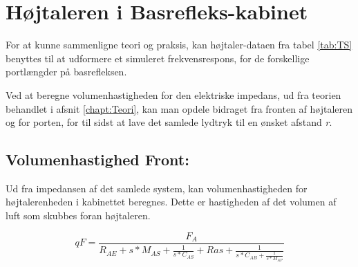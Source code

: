 \section{Højtaleren i Basrefleks-kabinet}

For at kunne sammenligne teori og praksis, kan højtaler-dataen fra tabel \ref{tab:TS} benyttes til at udformere et simuleret frekvensrespons, for de forskellige portlængder på basrefleksen.

Ved at beregne volumenhastigheden for den elektriske impedans, ud fra teorien behandlet i afsnit \ref{chapt:Teori}, kan man opdele bidraget fra fronten af højtaleren og for porten, for til sidst at lave det samlede lydtryk til en ønsket afstand \textit{r}. 


\subsection{Volumenhastighed Front:}
\label{sec:sim_calc}

Ud fra impedansen af det samlede system, kan volumenhastigheden for højtalerenheden i kabinettet beregnes. Dette er hastigheden af det volumen af luft som skubbes foran højtaleren. 

\begin{equation}
	qF=\frac{F_A}{R_{AE}+s*M_{AS}+\frac{1}{s*C_{AS}}+Ras+\frac{1}{s*C_{AB}+\frac{1}{s*M_{AP}}} }
\end{equation}







